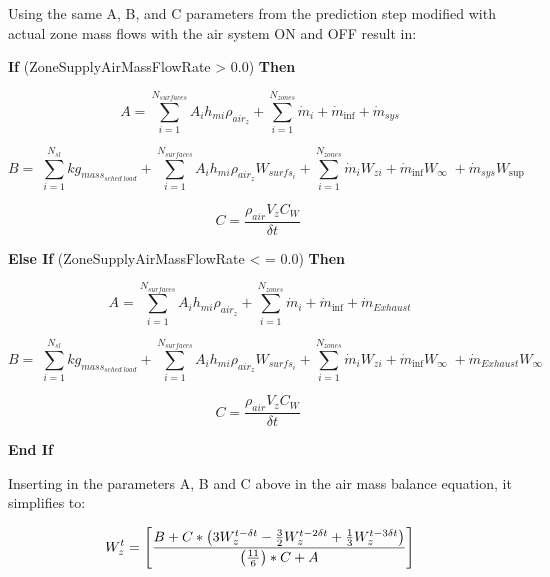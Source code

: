 Using the same A, B, and C parameters from the prediction step modified with actual zone mass flows with the air system ON and OFF result in:

\textbf{If} (ZoneSupplyAirMassFlowRate \textgreater{} 0.0) \textbf{Then}

\begin{equation}
A = \sum\limits_{i = 1}^{{N_{surfaces}}} {{A_i}{h_{mi}}} {\rho_{ai{r_z}}} + \sum\limits_{i = 1}^{{N_{zones}}} {{{\dot m}_i}}  + {\dot m_{\inf }} + {\dot m_{sys}}
\end{equation}

\begin{equation}
B = \;\sum\limits_{i = 1}^{{N_{sl}}} {k{g_{mas{s_{sched\;load}}}}}  + \sum\limits_{i = 1}^{{N_{surfaces}}} {{A_i}{h_{mi}}} {\rho_{ai{r_z}}}{W_{surf{s_i}}} + \sum\limits_{i = 1}^{{N_{zones}}} {{{\dot m}_i}} {W_{zi}} + {\dot m_{\inf }}{W_\infty }\; + {\dot m_{sys}}{W_{\sup }}
\end{equation}

\begin{equation}
C = \frac{{{\rho_{air}}{V_z}{C_W}}}{{\delta t}}\;
\end{equation}

\textbf{Else If} (ZoneSupplyAirMassFlowRate \textless{} = 0.0) \textbf{Then}

\begin{equation}
A = \sum\limits_{i = 1}^{{N_{surfaces}}} {{A_i}{h_{mi}}} {\rho_{ai{r_z}}} + \sum\limits_{i = 1}^{{N_{zones}}} {{{\dot m}_i}}  + {\dot m_{\inf }} + {\dot m_{Exhaust}}
\end{equation}

\begin{equation}
B = \;\sum\limits_{i = 1}^{{N_{sl}}} {k{g_{mas{s_{sched\;load}}}}}  + \sum\limits_{i = 1}^{{N_{surfaces}}} {{A_i}{h_{mi}}} {\rho_{ai{r_z}}}{W_{surf{s_i}}} + \sum\limits_{i = 1}^{{N_{zones}}} {{{\dot m}_i}} {W_{zi}} + {\dot m_{\inf }}{W_\infty }\; + {\dot m_{Exhaust}}{W_\infty }
\end{equation}

\begin{equation}
C = \frac{{{\rho_{air}}{V_z}{C_W}}}{{\delta t}}\;
\end{equation}

\textbf{End If}

Inserting in the parameters A, B and C above in the air mass balance equation, it simplifies to:

\begin{equation}
W_z^t = \left[ {\frac{{B + C * \left( {3W_z^{t - \delta t} - {\textstyle{3 \over 2}}W_z^{t - 2\delta t} + {\textstyle{1 \over 3}}W_z^{t - 3\delta t}} \right)}}{{\left( {{\textstyle{{11} \over 6}}} \right) * C + A}}} \right]
\end{equation}

